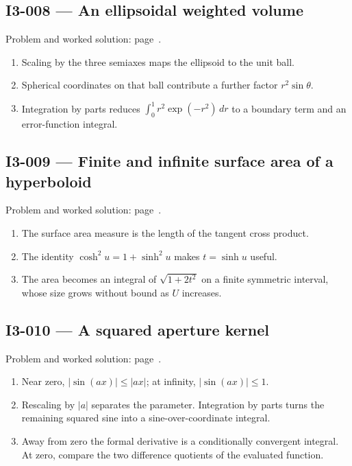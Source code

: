 \documentclass[11pt,oneside,openany]{book}
\begin{document}
\subsection*{I3-008 --- An ellipsoidal weighted volume}
\label{hints:I3-008}
Problem and worked solution: page~\pageref{problem:I3-008}.

\begin{enumerate}
\item Scaling by the three semiaxes maps the ellipsoid to the unit ball.
\item Spherical coordinates on that ball contribute a further factor \(r^2\sin\theta\).
\item Integration by parts reduces \(\int_0^1r^2\exp(-r^2)\,dr\) to a boundary term and an error-function integral.
\end{enumerate}
\subsection*{I3-009 --- Finite and infinite surface area of a hyperboloid}
\label{hints:I3-009}
Problem and worked solution: page~\pageref{problem:I3-009}.

\begin{enumerate}
\item The surface area measure is the length of the tangent cross product.
\item The identity \(\cosh^2u=1+\sinh^2u\) makes \(t=\sinh u\) useful.
\item The area becomes an integral of \(\sqrt{1+2t^2}\) on a finite symmetric interval, whose size grows without bound as \(U\) increases.
\end{enumerate}
\subsection*{I3-010 --- A squared aperture kernel}
\label{hints:I3-010}
Problem and worked solution: page~\pageref{problem:I3-010}.

\begin{enumerate}
\item Near zero, \(|\sin(ax)|\le|ax|\); at infinity, \(|\sin(ax)|\le1\).
\item Rescaling by \(|a|\) separates the parameter. Integration by parts turns the remaining squared sine into a sine-over-coordinate integral.
\item Away from zero the formal derivative is a conditionally convergent integral. At zero, compare the two difference quotients of the evaluated function.
\end{enumerate}
\end{document}
